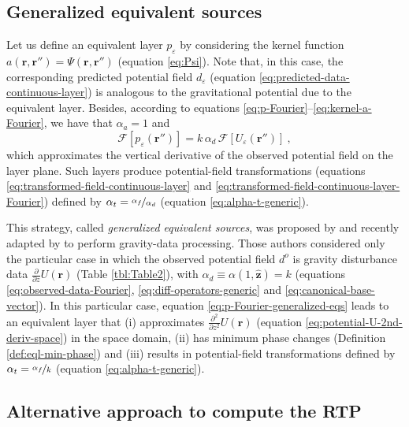 \documentclass[manuscript,noblind]{geophysics}
\begin{document}
	
	\subsection{Generalized equivalent sources}
	
	Let us define an equivalent layer $p_{\varepsilon}$ by considering the kernel function 
	$a(\mathbf{r}, \mathbf{r}'') = \Psi(\mathbf{r}, \mathbf{r}'')$ (equation \ref{eq:Psi}). 
	Note that, in this case, 
	the corresponding predicted potential field $d_{\varepsilon}$ (equation \ref{eq:predicted-data-continuous-layer}) 
	is analogous to the gravitational potential due to the equivalent layer.
	Besides, according to equations \ref{eq:p-Fourier}--\ref{eq:kernel-a-Fourier}, we have that 
	$\alpha_{a} = 1$ and 
	\begin{equation}
		\mathcal{F} [ p_{\varepsilon}(\mathbf{r}'') ] =
		k \, \alpha_{d} \, \mathcal{F} \left[ U_{\varepsilon}(\mathbf{r}'') \right]  \: ,
		\label{eq:p-Fourier-generalized-eqs}
	\end{equation}
	which approximates the vertical derivative of the observed potential field on the layer plane. 
	Such layers produce potential-field transformations (equations \ref{eq:transformed-field-continuous-layer} and 
	\ref{eq:transformed-field-continuous-layer-Fourier}) defined by $\alpha_{t} = \nicefrac{\alpha_{f}}{\alpha_{d}}$ (equation \ref{eq:alpha-t-generic}).
	
	This strategy, called \textit{generalized equivalent sources}, was proposed by \citet{cordell1992} and recently adapted by 
	\citet{soler_uieda2021} to perform gravity-data processing. 
	Those authors considered only the particular case in which the observed potential field $d^{o}$ is gravity disturbance data 
	$\tfrac{\partial}{\partial z} U(\mathbf{r})$  (Table \ref{tbl:Table2}), 
	with $\alpha_{d} \equiv \alpha(1, \hat{\mathbf{z}}) = k$ (equations \ref{eq:observed-data-Fourier}, 
	\ref{eq:diff-operators-generic} and \ref{eq:canonical-base-vector}).
	In this particular case, equation \ref{eq:p-Fourier-generalized-eqs} leads to an equivalent layer that 
	(i) approximates $\tfrac{\partial^{2}}{\partial z^{2}} U(\mathbf{r})$ (equation \ref{eq:potential-U-2nd-deriv-space}) 
	in the space domain, 
	(ii) has minimum phase changes (Definition \ref{def:eql-min-phase}) and 
	(iii) results in potential-field transformations defined by $\alpha_{t} = \nicefrac{\alpha_{f}}{k}$ (equation \ref{eq:alpha-t-generic}).
	
	\subsection{Alternative approach to compute the RTP}
	
\end{document}

